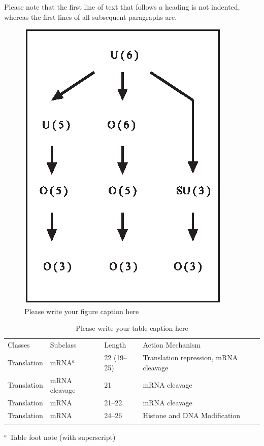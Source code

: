 Please note that the first line of text that follows a heading is not indented, whereas the first lines of all subsequent paragraphs are.

%
\begin{figure}[t]
\sidecaption[t]
\includegraphics[scale=.65]{figure}
%
%
\caption{Please write your figure caption here}
\label{fig:A1}       %
\end{figure}

%
\begin{table}
\caption{Please write your table caption here}
\label{tab:A1}       %
%
%
\begin{tabular}{p{2cm}p{2.4cm}p{2cm}p{4.9cm}}
\hline\noalign{\smallskip}
Classes & Subclass & Length & Action Mechanism  \\
\noalign{\smallskip}\hline\noalign{\smallskip}
Translation & mRNA$^a$  & 22 (19--25) & Translation repression, mRNA cleavage\\
Translation & mRNA cleavage & 21 & mRNA cleavage\\
Translation & mRNA  & 21--22 & mRNA cleavage\\
Translation & mRNA  & 24--26 & Histone and DNA Modification\\
\noalign{\smallskip}\hline\noalign{\smallskip}
\end{tabular}
$^a$ Table foot note (with superscript)
\end{table}
%

